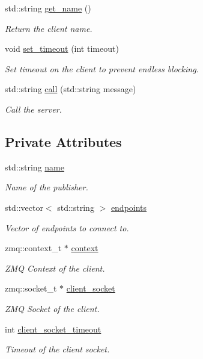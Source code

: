 \begin{DoxyCompactItemize}
std\-::string \hyperlink{classzcm_1_1Client_ad4178e9b209db19994204b9dad7aa374}{get\-\_\-name} ()
\begin{DoxyCompactList}\small\item\em Return the client name. \end{DoxyCompactList}\item 
void \hyperlink{classzcm_1_1Client_aec14e7e61a88c918df8c2bae729923b2}{set\-\_\-timeout} (int timeout)
\begin{DoxyCompactList}\small\item\em Set timeout on the client to prevent endless blocking. \end{DoxyCompactList}\item 
std\-::string \hyperlink{classzcm_1_1Client_a9f62555765181c2feee4631a4b50786d}{call} (std\-::string message)
\begin{DoxyCompactList}\small\item\em Call the server. \end{DoxyCompactList}\end{DoxyCompactItemize}
\subsection*{Private Attributes}
\begin{DoxyCompactItemize}
\item 
std\-::string \hyperlink{classzcm_1_1Client_ae972b951134774fd2246d802e2bc6fc0}{name}
\begin{DoxyCompactList}\small\item\em Name of the publisher. \end{DoxyCompactList}\item 
std\-::vector$<$ std\-::string $>$ \hyperlink{classzcm_1_1Client_a01cfee292bb3546a47ec70fff35ff1b6}{endpoints}
\begin{DoxyCompactList}\small\item\em Vector of endpoints to connect to. \end{DoxyCompactList}\item 
zmq\-::context\-\_\-t $\ast$ \hyperlink{classzcm_1_1Client_a0519b850f2a5167a0636f7a7adcabe1e}{context}
\begin{DoxyCompactList}\small\item\em Z\-M\-Q Context of the client. \end{DoxyCompactList}\item 
zmq\-::socket\-\_\-t $\ast$ \hyperlink{classzcm_1_1Client_a022f5e131d58cea7f6cc49b4580940a0}{client\-\_\-socket}
\begin{DoxyCompactList}\small\item\em Z\-M\-Q Socket of the client. \end{DoxyCompactList}\item 
int \hyperlink{classzcm_1_1Client_a25fa4ff78b8e962ca8436a8815bf7924}{client\-\_\-socket\-\_\-timeout}
\begin{DoxyCompactList}\small\item\em Timeout of the client socket. \end{DoxyCompactList}\end{DoxyCompactItemize}


